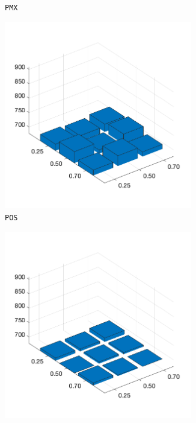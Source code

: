 \begin{figure}[H]
\begin{subfigure}[b]{0.25\textwidth}
		\caption{\texttt{PMX}}
		\label{fig:z}
    	\end{subfigure}
%
	\begin{subfigure}[b]{0.25\textwidth}
		\centering
		\includegraphics[width=0.9\textwidth]{crossover/min/cross_position_based_1.png}
		\caption{\texttt{POS}}
		\label{fig:x}
    	\end{subfigure}
%
	\begin{subfigure}[b]{0.25\textwidth}
		\centering
		\includegraphics[width=0.9\textwidth]{crossover/min/cross_seq_constructive_1.png}

\end{subfigure}
\end{figure}
